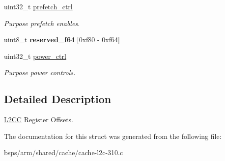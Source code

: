 \begin{DoxyCompactItemize}
\item 
uint32\+\_\+t \mbox{\hyperlink{group__L2C-310__cache_ga518e788c108e0d0c89e82fb2e1a13fe9}{prefetch\+\_\+ctrl}}
\begin{DoxyCompactList}\small\item\em Purpose prefetch enables. \end{DoxyCompactList}\item 
uint8\+\_\+t {\bfseries reserved\+\_\+f64} \mbox{[}0xf80 -\/ 0xf64\mbox{]}
\item 
uint32\+\_\+t \mbox{\hyperlink{group__L2C-310__cache_ga2ae509b4cf229f50e710c494296d6c26}{power\+\_\+ctrl}}
\begin{DoxyCompactList}\small\item\em Purpose power controls. \end{DoxyCompactList}\end{DoxyCompactItemize}


\subsection{Detailed Description}
\mbox{\hyperlink{structL2CC}{L2\+CC}} Register Offsets. 

The documentation for this struct was generated from the following file\+:\begin{DoxyCompactItemize}
\item 
bsps/arm/shared/cache/cache-\/l2c-\/310.\+c\end{DoxyCompactItemize}
